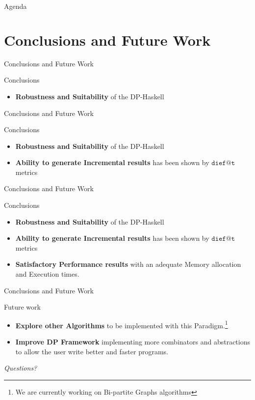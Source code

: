 \documentclass{beamer}
\begin{document}
  \begin{frame}{Agenda}
    \section{Conclusions and Future Work}
    \tableofcontents[currentsection]
  \end{frame}

  \begin{frame}[fragile]{Conclusions and Future Work}
    \begin{block}{Conclusions}      
      \begin{itemize}
        \item \textbf{Robustness and Suitability} of the DP-Haskell 
      \end{itemize}
    \end{block}
  \end{frame}

  \begin{frame}[fragile]{Conclusions and Future Work}
    \begin{block}{Conclusions}      

    \begin{itemize}
      \item \textbf{Robustness and Suitability} of the DP-Haskell 
      \item \textbf{Ability to generate Incremental results} has been shown by $\mathtt{dief@t}$ metrics 
    \end{itemize}
  \end{block}
  \end{frame}

  \begin{frame}[fragile]{Conclusions and Future Work}
    \begin{block}{Conclusions}      

    \begin{itemize}
      \item \textbf{Robustness and Suitability} of the DP-Haskell 
      \item \textbf{Ability to generate Incremental results} has been shown by $\mathtt{dief@t}$ metrics
      \item \textbf{Satisfactory Performance results} with an adequate Memory allocation and Execution times. 
    \end{itemize}
  \end{block}
  \end{frame}

  \begin{frame}[fragile]{Conclusions and Future Work}
    \begin{block}{Future work}      
    \begin{itemize}
      \item \textbf{Explore other Algorithms} to be implemented with this Paradigm.\footnote{We are currently working on Bi-partite Graphs algorithms}
      \item \textbf{Improve DP Framework} implementing more combinators and abstractions to allow the user write better and faster programs.
    \end{itemize}
  \end{block}
  \end{frame}

  \begin{frame}
    \centering \Huge
    \emph{Questions?}
  \end{frame}  
  
\end{document}
